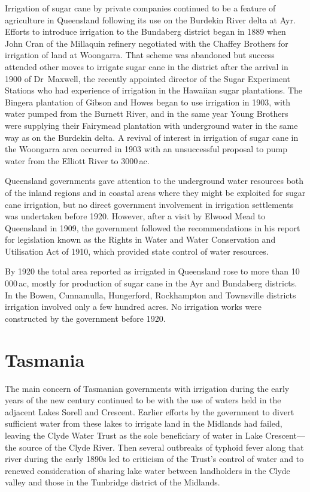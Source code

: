 Irrigation of sugar cane by private companies continued to be a
feature of agriculture in Queensland following its use on the Burdekin
River delta at Ayr.  Efforts to introduce irrigation to the Bundaberg
district began in 1889 when John Cran of the Millaquin refinery
negotiated with the Chaffey Brothers for irrigation of land at
Woongarra. That scheme was abandoned but success attended other moves
to irrigate sugar cane in the district after the arrival in 1900 of
Dr~Maxwell, the recently appointed director of the Sugar Experiment
Stations who had experience of irrigation in the Hawaiian sugar
plantations.  The Bingera plantation of Gibson and Howes began to use
irrigation in 1903, with water pumped from the Burnett River, and in
the same year Young Brothers were supplying their Fairymead plantation
with underground water in the same way as on the Burdekin delta.  A
revival of interest in irrigation of sugar cane in the Woongarra area
occurred in 1903 with an unsuccessful proposal to pump water from the
Elliott River to 3000\,ac.

Queensland governments gave attention to the underground water
resources both of the inland regions and in coastal areas where they
might be exploited for sugar cane irrigation, but no direct government
involvement in irrigation settlements was undertaken before 1920.
However, after a visit by Elwood Mead to Queensland in 1909, the
government followed the recommendations in his report for legislation
known as the Rights in Water and Water Conservation and Utilisation
Act of 1910, which provided state control of water resources.

By 1920 the total area reported as irrigated in Queensland rose to
more than 10\,000\,ac, mostly for production of sugar cane in the Ayr
and Bundaberg districts.  In the Bowen, Cunnamulla, Hungerford,
Rockhampton and Townsville districts irrigation involved only a few
hundred acres.  No irrigation works were constructed by the government
before 1920.

\section*{Tasmania}

The main concern of Tasmanian governments with irrigation during the
early years of the new century continued to be with the use of waters
held in the adjacent Lakes Sorell and Crescent.  Earlier efforts by
the government to divert sufficient water from these lakes to irrigate
land in the Midlands had failed, leaving the Clyde Water Trust as the
sole beneficiary of water in Lake Crescent---the source of the Clyde
River.  Then several outbreaks of typhoid fever along that river
during the early 1890s led to criticism of the Trust's control of
water and to renewed consideration of sharing lake water between
landholders in the Clyde valley and those in the Tunbridge district of
the Midlands.

